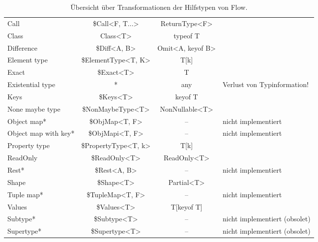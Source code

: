 \begin{table}[tbh]
  \footnotesize
  \begin{tabu} to 
    \midrule
        &      &  &  \\
    \midrule
    Call                      & \$Call<F, T...>        & ReturnType<F>            & {} \\
    Class                     & Class<T>               & typeof T                 & {} \\
    Difference                & \$Diff<A, B>           & Omit<A, keyof B>         & {} \\
    Element type              & \$ElementType<T, K>    & T[k]                     & {} \\
    Exact                     & \$Exact<T>             & T                        & {} \\
    Existential type          & *                      & any                      & Verlust von Typinformation! \\
    Keys                      & \$Keys<T>              & keyof T                  & {} \\
    None maybe type           & \$NonMaybeType<T>      & NonNullable<T>           & {} \\
    Object map*               & \$ObjMap<T, F>         & --                       & nicht implementiert \\
    Object map with key*      & \$ObjMapi<T, F>        & --                       & nicht implementiert \\
    Property type             & \$PropertyType<T, k>   & T[k]                     & {} \\
    ReadOnly                  & \$ReadOnly<T>          & ReadOnly<T>              & {} \\
    Rest*                     & \$Rest<A, B>           & --                       & nicht implementiert \\
    Shape                     & \$Shape<T>             & Partial<T>               & {} \\
    Tuple map*                & \$TupleMap<T, F>       & --                       & nicht implementiert \\
    Values                    & \$Values<T>            & T[keyof T]               & {} \\
    Subtype*                  & \$Subtype<T>           & --                       & nicht implementiert (obsolet) \\
    Supertype*                & \$Supertype<T>         & --                       & nicht implementiert (obsolet) \\
    \midrule
  \end{tabu}
  \caption{Übersicht über Transformationen der Hilfstypen von Flow.}
  \label{tab:transformation-utility-types}
\end{table}
